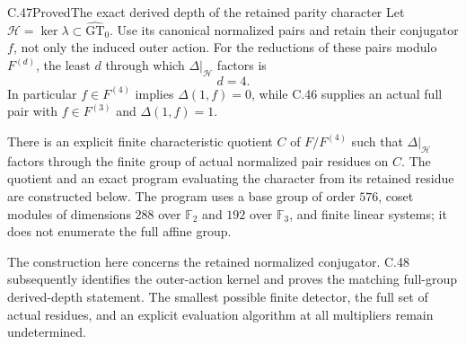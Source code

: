 \begin{statement}{C.47}{Proved}{The exact derived depth of the retained parity character}
Let $\mathcal H=\ker\lambda\subset\widehat{\mathrm{GT}}_0$.
Use its canonical normalized pairs and retain their conjugator $f$,
not only the induced outer action. For the reductions of these pairs
modulo $F^{(d)}$, the least $d$ through which $\Delta|_{\mathcal H}$
factors is
\[
                              d=4.                    \tag{C.47.1}
\]
In particular $f\in F^{(4)}$ implies $\Delta(1,f)=0$, while
C.46 supplies an actual full pair with $f\in F^{(3)}$ and
$\Delta(1,f)=1$.

There is an explicit finite characteristic quotient $C$ of
$F/F^{(4)}$ such that $\Delta|_{\mathcal H}$ factors through
the finite group of actual normalized pair residues on $C$.
The quotient and an exact program evaluating the character from
its retained residue are constructed below. The program uses a
base group of order $576$, coset modules of dimensions $288$ over
$\mathbb F_2$ and $192$ over $\mathbb F_3$, and finite linear
systems; it does not enumerate the full affine group.

The construction here concerns the retained normalized conjugator.
C.48 subsequently identifies the outer-action kernel and proves the
matching full-group derived-depth statement. The smallest possible
finite detector, the full set of actual residues, and an explicit
evaluation algorithm at all multipliers remain undetermined.
\end{statement}

